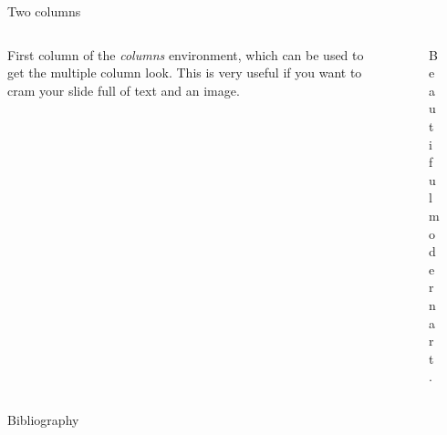 \documentclass{beamer}
\begin{document}
\begin{frame}{Two columns}

    \begin{columns}
    
        \begin{column}[]{0.5\textwidth}
            First column of the \emph{columns} environment, which can be used to
            get the multiple column look. This is very useful if you want to
            cram your slide full of text and an image.
        \end{column}
        \begin{column}[]{0.5\textwidth}
            \begin{figure}[h]
                \centering
                \caption{Beautiful modern art.}
                \label{fig:modern-art}
            \end{figure}
        \end{column}
        
    \end{columns}

\end{frame}

\begin{frame}{Bibliography}

    

\end{frame}
\end{document}
